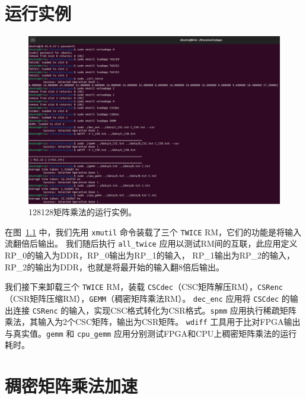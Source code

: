\chapter{运行实例}

\begin{figure}[htbp]
\centerline{\includegraphics[width=\columnwidth]{figures/run.png}}
\caption{128\texttimes{}128矩阵乘法的运行实例。}
\label{fig:run}
\end{figure}

在图~\ref{fig:run} 中，我们先用 \verb|xmutil| 命令装载了三个 \verb|TWICE| RM，它们的功能是将输入流翻倍后输出。
我们随后执行 \verb|all_twice| 应用以测试RM间的互联，此应用定义RP\_0的输入为DDR，RP\_0输出为RP\_1的输入，
RP\_1输出为RP\_2的输入，RP\_2的输出为DDR，也就是将最开始的输入翻8倍后输出。

我们接下来卸载三个 \verb|TWICE| RM，装载 \verb|CSCdec|（CSC矩阵解压RM），\verb|CSRenc|（CSR矩阵压缩RM），\verb|GEMM|（稠密矩阵乘法RM）。
\verb|dec_enc| 应用将 \verb|CSCdec| 的输出连接 \verb|CSRenc| 的输入，实现CSC格式转化为CSR格式。\verb|spmm| 应用执行稀疏矩阵乘法，其输入为2个CSC矩阵，输出为CSR矩阵。
\verb|wdiff| 工具用于比对FPGA输出与真实值。\verb|gemm| 和 \verb|cpu_gemm| 应用分别测试FPGA和CPU上稠密矩阵乘法的运行耗时。

\chapter{稠密矩阵乘法加速}

